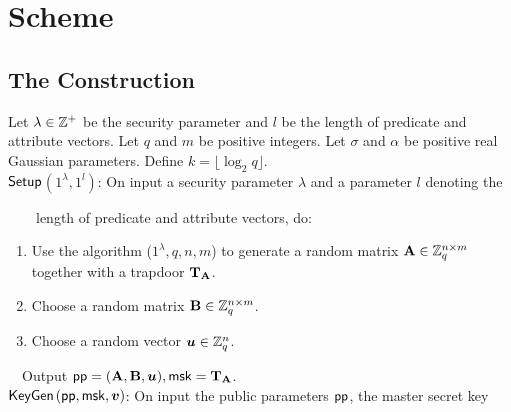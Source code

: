 \section{Scheme}

\subsection{The Construction}
Let $\lambda \in \mathbb{Z}^{+}$ be the security parameter and $l$ be the length of predicate and attribute vectors. Let $q$ and $m$ be positive integers. Let $\sigma$ and $\alpha$ be positive real Gaussian parameters. Define $k=\lfloor \log_{2}q\rfloor$. \\[0.6cm]
$\mathsf{Setup}$$(1^{\lambda},1^{l})$: On input a security parameter $\lambda$ and a parameter $l$ denoting the

~~~~length of predicate and attribute vectors, do:
\begin{enumerate}
\item Use the algorithm \trapgen ($1^{\lambda},q,n,m$) to generate a random matrix $\textbf{A} \in \mathbb{Z}^{n \times m}_{q}$ together with a trapdoor $\mathbf{T}_{\mathbf{A}}$.\

\item Choose a random matrix $\mathbf{B} \in \mathbb{Z}^{n \times m}_{q}$.\

\item Choose a random vector $\boldsymbol{u} \in \mathbb{Z}^{n}_{q}$.
\end{enumerate}
~~Output $\mathsf{pp}=(\mathbf{A}, \mathbf{B}, \boldsymbol{u}),\mathsf{msk}=\mathbf{T}_{\mathbf{A}}$.\\[0.4cm]
$\mathsf{KeyGen}$$(\mathsf{pp},\mathsf{msk},\boldsymbol{v})$: On input the public parameters $\mathsf{pp}$, the master secret key

